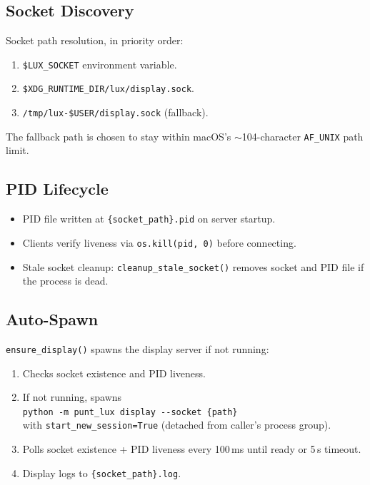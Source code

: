 \documentclass[a4paper,10pt]{article}
\begin{document}
\subsection{Socket Discovery}

Socket path resolution, in priority order:

\begin{enumerate}
  \item \texttt{\$LUX\_SOCKET} environment variable.
  \item \texttt{\$XDG\_RUNTIME\_DIR/lux/display.sock}.
  \item \texttt{/tmp/lux-\$USER/display.sock} (fallback).
\end{enumerate}

The fallback path is chosen to stay within macOS's $\sim$104-character
\texttt{AF\_UNIX} path limit.

\subsection{PID Lifecycle}

\begin{itemize}
  \item PID file written at \texttt{\{socket\_path\}.pid} on server
    startup.
  \item Clients verify liveness via \texttt{os.kill(pid, 0)} before
    connecting.
  \item Stale socket cleanup: \texttt{cleanup\_stale\_socket()} removes
    socket and PID file if the process is dead.
\end{itemize}

\subsection{Auto-Spawn}

\texttt{ensure\_display()} spawns the display server if not running:

\begin{enumerate}
  \item Checks socket existence and PID liveness.
  \item If not running, spawns\\
    \texttt{python -m punt\_lux display -{}-socket \{path\}}\\
    with \texttt{start\_new\_session=True} (detached from caller's
    process group).
  \item Polls socket existence + PID liveness every 100\,ms until
    ready or 5\,s timeout.
  \item Display logs to \texttt{\{socket\_path\}.log}.
\end{enumerate}
\end{document}
